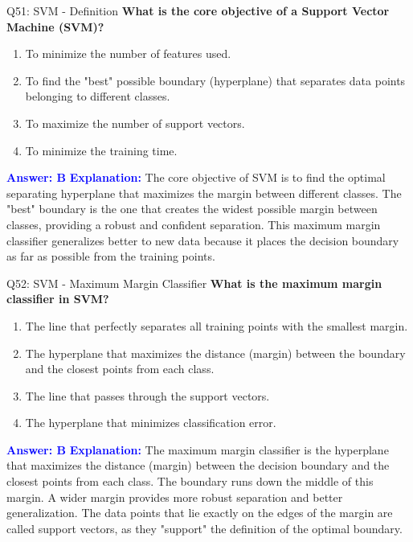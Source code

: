 \documentclass[8pt]{beamer}
\begin{document}
	
	\begin{frame}{Q51: SVM - Definition}
		\fontsize{6.5}{7.5}\selectfont
		\textbf{What is the core objective of a Support Vector Machine (SVM)?}
		\begin{enumerate}
			\item To minimize the number of features used.
			\item To find the "best" possible boundary (hyperplane) that separates data points belonging to different classes.
			\item To maximize the number of support vectors.
			\item To minimize the training time.
		\end{enumerate}
		\vspace{0.1cm}
		\textcolor{blue}{\textbf{Answer: B}}
		\vspace{0.1cm}
		\textcolor{blue}{\textbf{Explanation:}} The core objective of SVM is to find the optimal separating hyperplane that maximizes the margin between different classes. The "best" boundary is the one that creates the widest possible margin between classes, providing a robust and confident separation. This maximum margin classifier generalizes better to new data because it places the decision boundary as far as possible from the training points.
	\end{frame}
	
	\begin{frame}{Q52: SVM - Maximum Margin Classifier}
		\fontsize{6.5}{7.5}\selectfont
		\textbf{What is the maximum margin classifier in SVM?}
		\begin{enumerate}
			\item The line that perfectly separates all training points with the smallest margin.
			\item The hyperplane that maximizes the distance (margin) between the boundary and the closest points from each class.
			\item The line that passes through the support vectors.
			\item The hyperplane that minimizes classification error.
		\end{enumerate}
		\vspace{0.1cm}
		\textcolor{blue}{\textbf{Answer: B}}
		\vspace{0.1cm}
		\textcolor{blue}{\textbf{Explanation:}} The maximum margin classifier is the hyperplane that maximizes the distance (margin) between the decision boundary and the closest points from each class. The boundary runs down the middle of this margin. A wider margin provides more robust separation and better generalization. The data points that lie exactly on the edges of the margin are called support vectors, as they "support" the definition of the optimal boundary.
	\end{frame}
	
\end{document}
